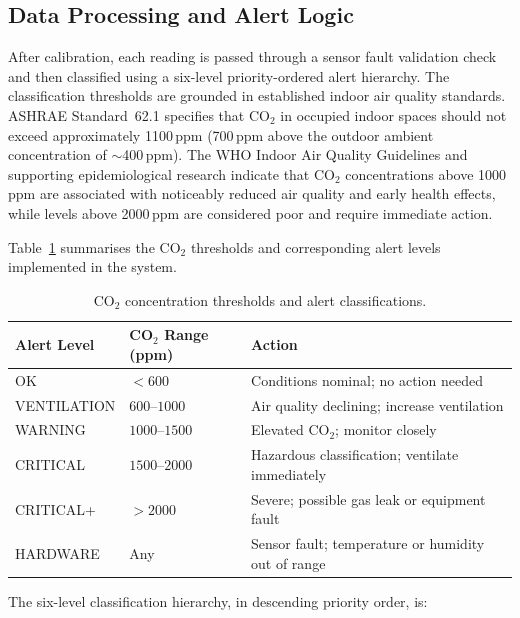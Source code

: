 \subsection{Data Processing and Alert Logic}

After calibration, each reading is passed through a sensor fault
validation check and then classified using a six-level priority-ordered
alert hierarchy. The classification thresholds are grounded in
established indoor air quality standards. ASHRAE Standard~62.1
\cite{r46} specifies that CO$_2$ in occupied indoor spaces should not
exceed approximately 1100\,ppm (700\,ppm above the outdoor ambient
concentration of $\sim$400\,ppm). The WHO Indoor Air Quality Guidelines
\cite{r47} and supporting epidemiological research \cite{r48,r49}
indicate that CO$_2$ concentrations above 1000\,ppm are associated with
noticeably reduced air quality and early health effects, while levels
above 2000\,ppm are considered poor and require immediate action.

Table~\ref{tab:alertlevels} summarises the CO$_2$ thresholds and
corresponding alert levels implemented in the system.

\begin{table}[tbp]
  \centering
  \caption{CO$_2$ concentration thresholds and alert classifications.}
  \label{tab:alertlevels}
  \begin{tabular}{lll}
    \toprule
    Alert Level    & CO$_2$ Range (ppm)  & Action \\
    \midrule
    OK             & $< 600$             & Conditions nominal; no action needed \\
    VENTILATION    & $600$--$1000$       & Air quality declining; increase ventilation \\
    WARNING        & $1000$--$1500$      & Elevated CO$_2$; monitor closely \\
    CRITICAL       & $1500$--$2000$      & Hazardous classification; ventilate immediately \\
    CRITICAL+      & $> 2000$            & Severe; possible gas leak or equipment fault \\
    HARDWARE       & Any                 & Sensor fault; temperature or humidity out of range \\
    \bottomrule
  \end{tabular}
\end{table}

The six-level classification hierarchy, in descending priority order, is:

